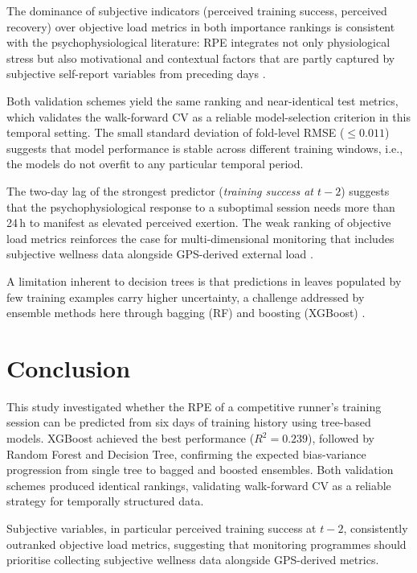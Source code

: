 \documentclass[10pt, twocolumn]{article}
\begin{document}
The dominance of subjective indicators (perceived training success,
perceived recovery) over objective load metrics in both importance rankings
is consistent with the psychophysiological literature: RPE integrates not
only physiological stress but also motivational and contextual factors that
are partly captured by subjective self-report variables from preceding days
\citep{foster2001}.

Both validation schemes yield the same ranking and near-identical test
metrics, which validates the walk-forward CV as a reliable model-selection
criterion in this temporal setting. The small standard deviation of fold-level
RMSE ($\leq 0.011$) suggests that model performance is stable across
different training windows, i.e., the models do not overfit to any
particular temporal period.

The two-day lag of the strongest predictor (\emph{training success at
$t-2$}) suggests that the psychophysiological response to a suboptimal
session needs more than 24\,h to manifest as elevated perceived
exertion. The weak ranking of objective load metrics reinforces the
case for multi-dimensional monitoring that includes subjective wellness
data alongside GPS-derived external load \citep{foster2001}.

A limitation inherent to decision trees is that predictions in leaves
populated by few training examples carry higher uncertainty, a challenge
addressed by ensemble methods here through bagging (RF) and boosting
(XGBoost) \citep{breiman2001, friedman2001}.

\section{Conclusion}
\label{sec:conclusion}

This study investigated whether the RPE of a competitive runner's
training session can be predicted from six days of training
history using tree-based models. XGBoost achieved the best
performance ($R^2 = 0.239$), followed by Random Forest and
Decision Tree, confirming the expected bias-variance progression
from single tree to bagged and boosted ensembles. Both validation
schemes produced identical rankings, validating walk-forward CV
as a reliable strategy for temporally structured data.

Subjective variables, in particular perceived training success at
$t-2$, consistently outranked objective load metrics, suggesting
that monitoring programmes should prioritise collecting subjective
wellness data alongside GPS-derived metrics.
\end{document}
